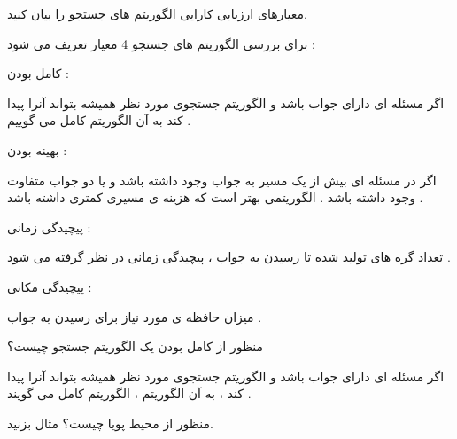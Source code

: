 \documentclass[12pt]{article}
\begin{document}
\vspace{20pt}
\noindent
معیارهای ارزیابی کارایی الگوریتم های جستجو را بیان کنید.



\begin{tcolorbox}
\noindent
برای بررسی الگوریتم های جستجو 4 معیار تعریف می شود :


\vspace{10pt}


\noindent
کامل بودن 
 :

\noindent
اگر مسئله ای دارای جواب باشد و الگوریتم جستجوی مورد نظر همیشه بتواند آنرا پیدا کند به آن الگوریتم کامل می گوییم .


\vspace{10pt}


\noindent
بهینه بودن 
 :

\noindent
اگر در مسئله ای بیش از یک مسیر به جواب وجود داشته باشد و یا دو جواب متفاوت وجود داشته باشد . الگوریتمی بهتر است که هزینه ی مسیری کمتری داشته باشد .



\vspace{10pt}


\noindent
پیچیدگی زمانی 
 :

\noindent
تعداد گره های تولید شده تا رسیدن به جواب ، پیچیدگی زمانی در نظر گرفته می شود .



\vspace{10pt}


\noindent
پیچیدگی مکانی 
 :

\noindent
میزان حافظه ی مورد نیاز برای رسیدن به جواب .

\end{tcolorbox}





\vspace{20pt}
\noindent
منظور از کامل بودن یک الگوریتم جستجو چیست؟



\begin{tcolorbox}
اگر مسئله ای دارای جواب باشد و الگوریتم جستجوی مورد نظر همیشه بتواند آنرا پیدا کند ، به آن الگوریتم ، الگوریتم کامل می گویند .
\end{tcolorbox}


\vspace{20pt}
\noindent
منظور از محیط پویا چیست؟ مثال بزنید.
\end{document}
